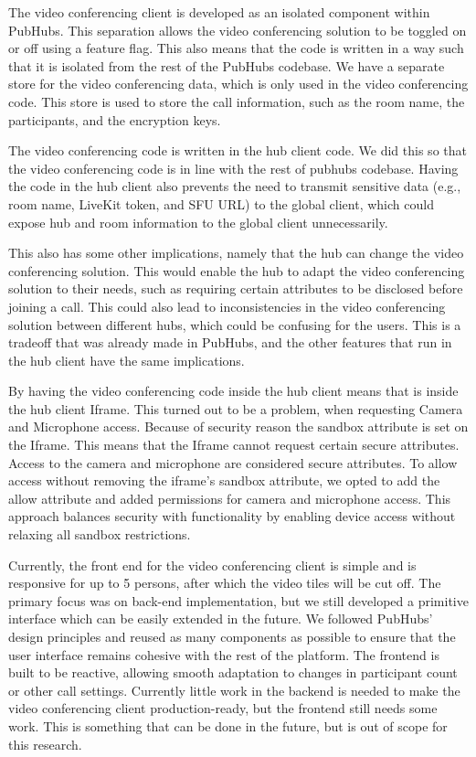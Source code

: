 \documentclass{report}
\begin{document}
The video conferencing client is developed as an isolated component within PubHubs. This separation allows the
video conferencing solution to be toggled on or off using a feature flag.
This also means that the code is written in a way such that it is isolated from the rest of the PubHubs codebase.
We have a separate store for the video conferencing data, which is only used in the video conferencing code.
This store is used to store the call information, such as the room name, the participants, and the encryption keys.

The video conferencing code is written in the hub client code. We did this so that the video conferencing code is in
line with the rest of pubhubs codebase.
Having the code in the hub client also prevents the need to transmit sensitive data (e.g., room name, LiveKit token,
and SFU URL) to the global client, which could expose hub and room information to the global client unnecessarily.

This also has some other implications, namely that the hub can change the video conferencing solution.
This would enable the hub to adapt the video conferencing solution to their needs, such as requiring certain
attributes to be disclosed before joining a call.
This could also lead to inconsistencies in the video conferencing solution between different hubs, which could be
confusing for the users. This is a tradeoff that was already made in PubHubs, and the other features that run in the
hub client have the same implications.

By having the video conferencing code inside the hub client means that is inside the hub client Iframe.
This turned out to be a problem, when requesting Camera and Microphone access. Because of security reason the
sandbox attribute is set on the Iframe. This means that the Iframe cannot request certain secure attributes.
Access to the camera and microphone are considered secure attributes.
To allow access without removing the iframe’s sandbox attribute, we opted to add the allow attribute and added
permissions for camera and microphone access.
This approach balances security with functionality by enabling device access without relaxing all sandbox restrictions.

Currently, the front end for the video conferencing client is simple and is responsive for up to 5 persons, after which
the video tiles will be cut off.
The primary focus was on back-end implementation, but we still developed a primitive interface which can be easily
extended in the future.
We followed PubHubs’ design principles and reused as many components as possible to ensure that the user interface
remains cohesive with the rest of the platform. The frontend is built to be
reactive, allowing smooth adaptation to changes in participant count or other call settings.
Currently little work in the backend is needed to make the video conferencing client production-ready, but the
frontend still needs some work. This is something that can be done in the future, but is out of scope for this
research.
\end{document}
